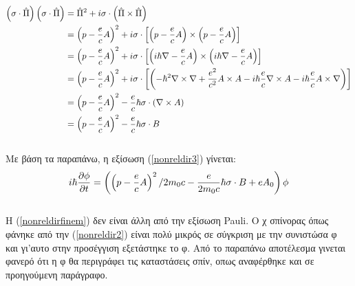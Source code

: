 \begin{equation*}
  \begin{split}
    \left(  \sigma \cdot\hat{\Pi} \right)   \left(  \sigma \cdot\hat{\Pi} \right)  &= \hat{\Pi}^2+i\sigma \cdot \left(  \hat{\Pi} \times \hat{\Pi} \right) \\
    &=\left(  p-\frac{e}{c}A \right) ^2+i\sigma \cdot \left[  \left(  p-\frac{e}{c}A \right)  \times \left(  p-\frac{e}{c}A \right)  \right] \\
    &=\left(  p-\frac{e}{c}A \right) ^2+i\sigma \cdot \left[  \left(  i \hbar \nabla-\frac{e}{c}A \right)  \times \left(  i \hbar \nabla-\frac{e}{c}A \right)  \right] \\
    &=\left(  p-\frac{e}{c}A \right) ^2+i\sigma \cdot \left[  \left(  - \hbar^2 \nabla \times \nabla+ \frac{e^2}{c^2}A \times A -i\hbar\frac{e}{c}\nabla \times A -i\hbar \frac{e}{c} A\times \nabla  \right)  \right] \\
    &=\left(  p-\frac{e}{c}A \right) ^2-\frac{e}{c}\hbar \sigma \cdot (\nabla \times A)\\
    &=\left(  p-\frac{e}{c}A \right) ^2-\frac{e}{c}\hbar \sigma \cdot B
  \end{split}
\end{equation*}\\
Με βάση τα παραπάνω, η εξίσωση (\ref{nonreldir3}) γίνεται: 
\begin{equation}
  i\hbar \frac{\partial \phi}{\partial t} = \left(  \left(  p-\frac{e}{c}A \right) ^2 /2m_0 c - \frac{e}{2 m_0 c}\hbar \sigma \cdot B+ eA_0 \right)  \phi
  \label{nonreldirfinem}
\end{equation}\\
Η (\ref{nonreldirfinem}) δεν είναι άλλη από την εξίσωση \textlatin{Pauli}. Ο χ σπίνορας όπως φάνηκε από την (\ref{nonreldir2}) είναι πολύ μικρός σε σύγκριση με την συνιστώσα φ και γι'αυτο στην προσέγγιση εξετάστηκε το φ. Από το παραπάνω αποτέλεσμα γινεται φανερό ότι η φ  θα περιγράφει τις καταστάσεις σπίν, οπως αναφέρθηκε και σε προηγούμενη παράγραφο. 
